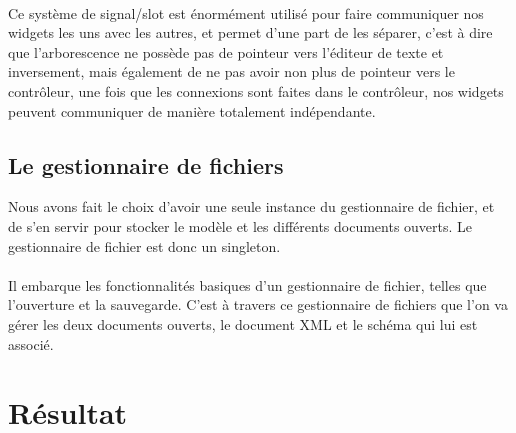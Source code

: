 \paragraph{}
Ce système de signal/slot est énormément utilisé pour faire communiquer nos widgets les uns avec les autres, et permet d'une part de les séparer, c'est à dire que l'arborescence ne possède pas de pointeur vers l'éditeur de texte et inversement, mais également de ne pas avoir non plus de pointeur vers le contrôleur, une fois que les connexions sont faites dans le contrôleur, nos widgets peuvent communiquer de manière totalement indépendante.

\subsection{Le gestionnaire de fichiers}
Nous avons fait le choix d'avoir une seule instance du gestionnaire de fichier, et de s'en servir pour stocker le modèle et les différents documents ouverts. Le gestionnaire de fichier est donc un singleton. 
\paragraph{}
Il embarque les fonctionnalités basiques d'un gestionnaire de fichier, telles que l'ouverture et la sauvegarde. C'est à travers ce gestionnaire de fichiers que l'on va gérer les deux documents ouverts, le document XML et le schéma qui lui est associé.

\section{Résultat}
